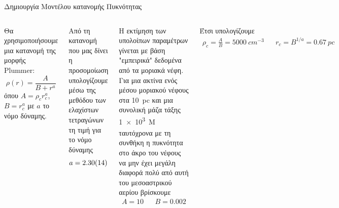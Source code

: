 \documentclass{beamer}
\begin{document}
\begin{frame}{Δημιουργία Μοντέλου κατανομής Πυκνότητας}
	
%	 
%	 
\begin{columns}
	 Θα χρησιμοποιήσουμε μια κατανομή της μορφής Plummer:
	\begin{equation}
	\rho (r)=\frac{A}{B+r^a}
	\end{equation}
	όπου $A=\rho _c r_c^a$, $B=r_c^a$ με $a$ το νόμο δύναμης. 
	
	
	Από τη κατανομή που μας δίνει η προσομοίωση υπολογίζουμε μέσω της μεθόδου των ελαχίστων τετραγώνων τη τιμή για το νόμο δύναμης
	\begin{equation}
	a=\num{2.3\pm 0.14}
	\end{equation}
	 
	Η εκτίμηση των υπολοίπων παραμέτρων γίνεται με βάση "εμπειρικά" δεδομένα από τα μοριακά νέφη. Για μια ακτίνα ενός μέσου μοριακού νέφους στα \SI{10}{pc} και μια συνολική μάζα τάξης \SI{1e3}{M_\odot} ταυτόχρονα με τη συνθήκη η πυκνότητα στο άκρο του νέφους να μην έχει μεγάλη διαφορά πολύ από αυτή του μεσοαστρικού αερίου βρίσκουμε
	\begin{align}
	A=10 && B=0.002
	\end{align}
	
	Έτσι υπολογίζουμε
	\begin{align}
	\rho _c = \frac{A}{B}= \SI{5000}{cm^{-3}} && r_c = B^{1/a} = \SI{0.67}{pc}
	\end{align}
\end{columns}
\end{frame}
\end{document}
